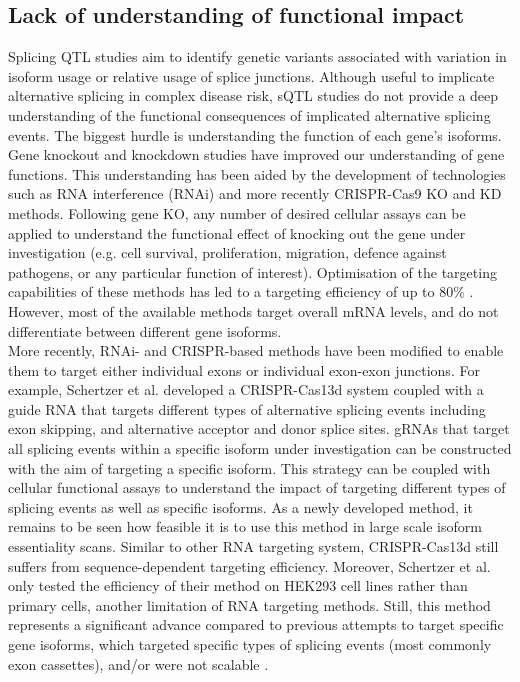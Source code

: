 \subsection{Lack of understanding of functional impact}
Splicing QTL studies aim to identify genetic variants associated with variation in isoform usage or relative usage of splice junctions. Although useful to implicate alternative splicing in complex disease risk, sQTL studies do not provide a deep understanding of the functional consequences of implicated alternative splicing events. The biggest hurdle is understanding the function of each gene's isoforms.\\

Gene knockout and knockdown studies have improved our understanding of gene functions. This understanding has been aided by the development of technologies such as RNA interference (RNAi) and more recently CRISPR-Cas9 KO and KD methods. Following gene KO, any number of desired cellular assays can be applied to understand the functional effect of knocking out the gene under investigation (e.g. cell survival, proliferation, migration, defence against pathogens, or any particular function of interest). Optimisation of the targeting capabilities of these methods has led to a targeting efficiency of up to 80\% \cite{Han2018-fw,Seki2018-ul}. However, most of the available methods target overall mRNA levels, and do not differentiate between different gene isoforms.\\

More recently, RNAi- and CRISPR-based methods have been modified to enable them to target either individual exons or individual exon-exon junctions. For example, Schertzer et al. \cite{Schertzer2023-rn} developed a CRISPR-Cas13d system coupled with a guide RNA that targets different types of alternative splicing events including exon skipping, and alternative acceptor and donor splice sites. gRNAs that target all splicing events within a specific isoform under investigation can be constructed with the aim of targeting a specific isoform. This strategy can be coupled with cellular functional assays to understand the impact of targeting different types of splicing events as well as specific isoforms. As a newly developed method, it remains to be seen how feasible it is to use this method in large scale isoform essentiality scans. Similar to other RNA targeting system, CRISPR-Cas13d still suffers from sequence-dependent targeting efficiency. Moreover, Schertzer et al. only tested the efficiency of their method on HEK293 cell lines rather than primary cells, another limitation of RNA targeting methods. Still, this method represents a significant advance compared to previous attempts to target specific gene isoforms, which targeted specific types of splicing events (most commonly exon cassettes), and/or were not scalable \cite{Thomas2020-bu,Gonatopoulos-Pournatzis2018-nq}. 


